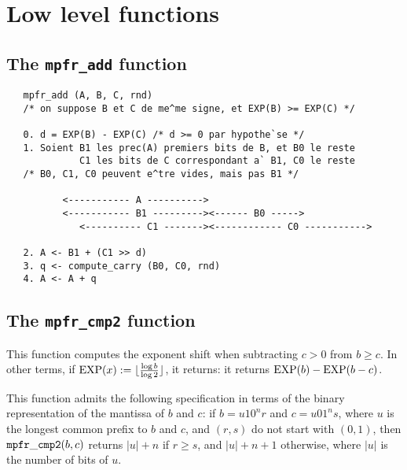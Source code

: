 \documentclass[12pt]{amsart}
\begin{document}
\section{Low level functions}

\subsection{The {\tt mpfr\_add} function}

\begin{verbatim}
   mpfr_add (A, B, C, rnd)
   /* on suppose B et C de me^me signe, et EXP(B) >= EXP(C) */

   0. d = EXP(B) - EXP(C) /* d >= 0 par hypothe`se */
   1. Soient B1 les prec(A) premiers bits de B, et B0 le reste
             C1 les bits de C correspondant a` B1, C0 le reste
   /* B0, C1, C0 peuvent e^tre vides, mais pas B1 */

          <----------- A ---------->
          <----------- B1 ---------><------ B0 ----->
             <---------- C1 -------><------------ C0 ----------->

   2. A <- B1 + (C1 >> d)
   3. q <- compute_carry (B0, C0, rnd)
   4. A <- A + q
\end{verbatim}

\subsection{The {\tt mpfr\_cmp2} function}

This function computes the exponent shift when subtracting $c > 0$ from
$b \ge c$. In other terms, if ${\rm EXP}(x) := 
\lfloor \frac{\log b}{\log 2} \rfloor$, it returns:
it returns ${\rm EXP}(b) - {\rm EXP}(b-c)$.

This function admits the following specification in terms of the binary
representation of the mantissa of $b$ and $c$: if $b = u 1 0^n r$ and
$c = u 0 1^n s$, where $u$ is the longest common prefix to $b$ and $c$,
and $(r,s)$ do not start with $(0, 1)$, then ${\tt mpfr\_cmp2}(b,c)$ returns
$|u| + n$ if $r \ge s$, and $|u| + n + 1$ otherwise, where $|u|$ is the number
of bits of $u$.
\end{document}
